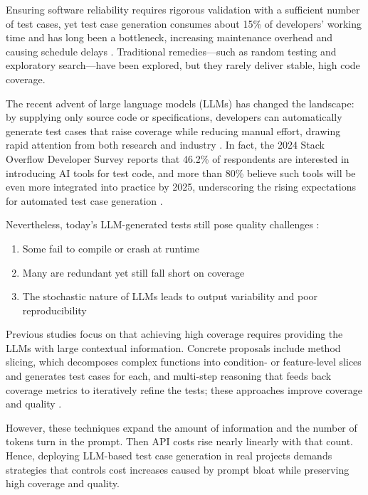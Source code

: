 Ensuring software reliability requires rigorous validation with a sufficient number of test cases, yet test case generation consumes about 15\% of developers’ working time and has long been a bottleneck, increasing maintenance overhead and causing schedule delays \cite{a_survey_on_unit_testing_practices_and_problems}. Traditional remedies—such as random testing and exploratory search—have been explored, but they rarely deliver stable, high code coverage.

The recent advent of large language models (LLMs) has changed the landscape: by supplying only source code or specifications, developers can automatically generate test cases that raise coverage while reducing manual effort, drawing rapid attention from both research and industry \cite{no_more_manual_tests?}. In fact, the 2024 Stack Overflow Developer Survey reports that 46.2\% of respondents are interested in introducing AI tools for test code, and more than 80\% believe such tools will be even more integrated into practice by 2025, underscoring the rising expectations for automated test case generation \cite{ai_in_the_development_workflow_interested,ai_tools_next_year}.

Nevertheless, today’s LLM-generated tests still pose quality challenges \cite{the_good_the_bad}: 

\begin{enumerate}[label=(\roman*)]
    \item Some fail to compile or crash at runtime
\vspace{0.2cm}
    \item Many are redundant yet still fall short on coverage
\vspace{0.2cm}
    \item The stochastic nature of LLMs leads to output variability and poor reproducibility
\end{enumerate}

Previous studies focus on that achieving high coverage requires providing the LLMs with large contextual information. Concrete proposals include method slicing, which decomposes complex functions into condition- or feature-level slices and generates test cases for each, and multi-step reasoning that feeds back coverage metrics to iteratively refine the tests; these approaches improve coverage and quality \cite{hits}.

However, these techniques expand the amount of information and the number of tokens turn in the prompt. Then API costs rise nearly linearly with that count. Hence, deploying LLM-based test case generation in real projects demands strategies that controls cost increases caused by prompt bloat while preserving high coverage and quality.

